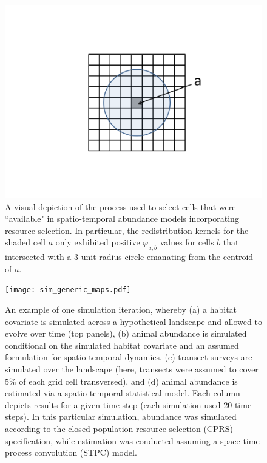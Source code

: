 \documentclass[times,mee,doublespace,]{besauth2}
\begin{document}
\begin{figure}
\begin{center}
\includegraphics[width=170mm]{rs_kernel.png}
\caption{A visual depiction of the process used to select cells that were ``available" in spatio-temporal abundance models incorporating resource selection.  In particular, the redistribution kernels for the shaded cell $a$ only exhibited positive $\varphi_{a,b}$ values for cells $b$ that intersected with a 3-unit radius circle emanating from the centroid of $a$.} \label{fig:res-sel}
\end{center}
\end{figure}

\begin{figure}
\begin{center}
\texttt{[image: sim\_generic\_maps.pdf]}
\caption{An example of one simulation iteration, whereby (a) a habitat covariate is simulated across a hypothetical landscape and allowed to evolve over time (top panels), (b) animal abundance is simulated conditional on the simulated habitat covariate and an assumed formulation for spatio-temporal dynamics, (c) transect surveys are simulated over the landscape (here, transects were assumed to cover $5\%$ of each grid cell transversed), and (d) animal abundance is estimated via a spatio-temporal statistical model.  Each column depicts results for a given time step (each simulation used 20 time steps).  In this particular simulation, abundance was simulated according to the closed population resource selection (CPRS) specification, while estimation was conducted assuming a space-time process convolution (STPC) model.}
\label{fig:sim_maps}
\end{center}
\end{figure}
\end{document}
